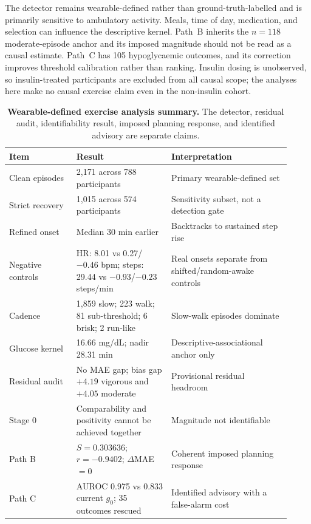 The detector remains wearable-defined rather than ground-truth-labelled and
is primarily sensitive to ambulatory activity. Meals, time of day, medication,
and selection can influence the descriptive kernel. Path~B inherits the
$n=118$ moderate-episode anchor and its imposed magnitude should not be read as
a causal estimate. Path~C has 105 hypoglycaemic outcomes, and its correction
improves threshold calibration rather than ranking. Insulin dosing is
unobserved, so insulin-treated participants are excluded from all causal scope;
the analyses here make no causal exercise claim even in the non-insulin cohort.

\begin{table}[H]
  \centering
  \caption{%
    \textbf{Wearable-defined exercise analysis summary.}
    The detector, residual audit, identifiability result, imposed planning
    response, and identified advisory are separate claims.%
  }
  \label{tab:exercise_arc_summary}
  \small
  \setlength{\tabcolsep}{3pt}
  \begin{tabular}{p{0.22\linewidth}p{0.31\linewidth}p{0.39\linewidth}}
    \toprule
    Item & Result & Interpretation \\
    \midrule
    Clean episodes & 2{,}171 across 788 participants & Primary wearable-defined set \\
    Strict recovery & 1{,}015 across 574 participants & Sensitivity subset, not a detection gate \\
    Refined onset & Median 30 min earlier & Backtracks to sustained step rise \\
    Negative controls & HR: 8.01 vs 0.27/$-0.46$ bpm; steps: 29.44 vs $-0.93$/$-0.23$ steps/min & Real onsets separate from shifted/random-awake controls \\
    Cadence & 1{,}859 slow; 223 walk; 81 sub-threshold; 6 brisk; 2 run-like & Slow-walk episodes dominate \\
    Glucose kernel & 16.66 mg/dL; nadir 28.31 min & Descriptive-associational anchor only \\
    Residual audit & No MAE gap; bias gap $+4.19$ vigorous and $+4.05$ moderate & Provisional residual headroom \\
    Stage 0 & Comparability and positivity cannot be achieved together & Magnitude not identifiable \\
    Path B & $S=0.303636$; $r=-0.9402$; $\Delta$MAE $=0$ & Coherent imposed planning response \\
    Path C & AUROC 0.975 vs 0.833 current $g_0$; 35 outcomes rescued & Identified advisory with a false-alarm cost \\
    \bottomrule
  \end{tabular}
\end{table}
